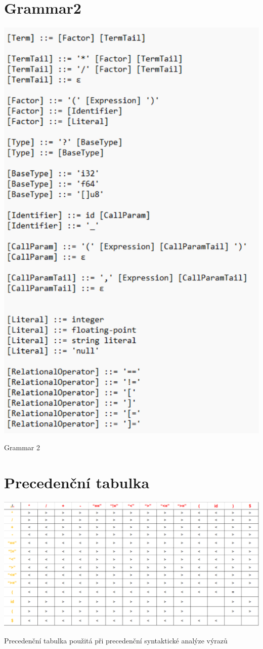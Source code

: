 \documentclass[a4paper, 11pt]{article}
\begin{document}
    
	\begin{table}[!ht]
        \section{Grammar2}
		\centering
		\includegraphics[width=0.7\linewidth]{Grammar2.pdf}
		\caption{Grammar 2}
		\label{table:png2pdf (2).pdf}
	\end{table}




	
	\begin{table}[!ht]
        \section{Precedenční tabulka}
		\centering
		\includegraphics[width=0.7\linewidth]{Precedenční tabulka.pdf}
		\caption{Precedenční tabulka použitá při precedenční syntaktické analýze výrazů}
		\label{table:prec_table}
	\end{table}
\end{document}
